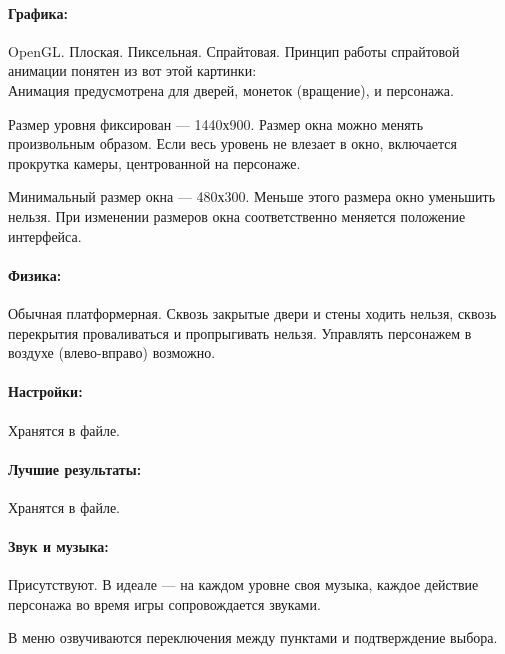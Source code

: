 \documentclass[12pt,a4paper]{article}
\begin{document}
\paragraph{Графика:}
OpenGL. Плоская. Пиксельная. Спрайтовая. Принцип работы спрайтовой анимации понятен из вот этой картинки:\\
Анимация предусмотрена для дверей, монеток (вращение), и персонажа.

Размер уровня фиксирован --- 1440х900. Размер окна можно менять произвольным образом. Если весь уровень не влезает в окно, включается прокрутка камеры, центрованной на персонаже.

Минимальный размер окна --- 480х300. Меньше этого размера окно уменьшить нельзя. При изменении размеров окна соответственно меняется положение интерфейса.
\paragraph{Физика:}
Обычная платформерная. Сквозь закрытые двери и стены ходить нельзя, сквозь перекрытия проваливаться и пропрыгивать нельзя. Управлять персонажем в воздухе (влево-вправо) возможно.
\paragraph{Настройки:}
Хранятся в файле.
\paragraph{Лучшие результаты:}
Хранятся в файле.
\paragraph{Звук и музыка:}
Присутствуют. В идеале --- на каждом уровне своя музыка, каждое действие персонажа во время игры сопровождается звуками.

В меню озвучиваются переключения между пунктами и подтверждение выбора.
\end{document}

